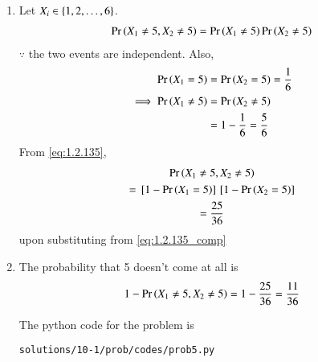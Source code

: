 \begin{enumerate}[label=(\roman*)]
\item Let $X_i \in \left\{1,2,\dots, 6\right\}$.
\begin{align}
\Pr\left(X_1 \ne 5, X_2 \ne 5\right) = \Pr\left(X_1 \ne 5\right)\Pr\left( X_2 \ne 5\right) 
\label{eq:1.2.135}
\end{align}
$\because$ the two events are independent. 
Also, 
\begin{align}
\Pr\left(X_1 = 5\right) &= \Pr\left( X_2 = 5\right)  = \frac{1}{6}
\\
\implies \Pr\left(X_1 \ne  5\right)&= \Pr\left( X_2 \ne 5\right)  
\\
&= 1-\frac{1}{6} = \frac{5}{6}
\label{eq:1.2.135_comp}
\end{align}
From \eqref{eq:1.2.135},
\begin{multline}
\Pr\left(X_1 \ne 5, X_2 \ne 5\right) 
\\
= {}\left[1-\Pr\left(X_1 = 5\right)\right]{}\left[1-\Pr\left( X_2 = 5\right) \right] 
\\
= \frac{25}{36} 
\end{multline}
upon substituting from \eqref{eq:1.2.135_comp}
\item  The probability that 5 doesn't come at all is 
\begin{align}
1-\Pr\left(X_1 \ne 5, X_2 \ne 5\right) = 1-\frac{25}{36} = \frac{11}{36}
\end{align}

The python code for the problem is 
\begin{lstlisting}
solutions/10-1/prob/codes/prob5.py
\end{lstlisting}
\end{enumerate}
